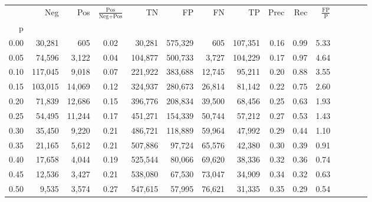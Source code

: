\begin{tabular}{rrrcrrrrrrrrrrr}
\toprule
{} &      Neg &     Pos & $\frac{\text{Pos}}{\text{Neg}+\text{Pos}}$ &       TN &       FP &       FN &       TP &  Prec &   Rec & $\frac{\text{FP}}{\text{P}}$ \\
p    &          &         &                                            &          &          &          &          &       &       &                              \\
\midrule
0.00 &   30,281 &     605 &                                       0.02 &   30,281 &  575,329 &      605 &  107,351 &  0.16 &  0.99 &                         5.33 \\
0.05 &   74,596 &   3,122 &                                       0.04 &  104,877 &  500,733 &    3,727 &  104,229 &  0.17 &  0.97 &                         4.64 \\
0.10 &  117,045 &   9,018 &                                       0.07 &  221,922 &  383,688 &   12,745 &   95,211 &  0.20 &  0.88 &                         3.55 \\
0.15 &  103,015 &  14,069 &                                       0.12 &  324,937 &  280,673 &   26,814 &   81,142 &  0.22 &  0.75 &                         2.60 \\
0.20 &   71,839 &  12,686 &                                       0.15 &  396,776 &  208,834 &   39,500 &   68,456 &  0.25 &  0.63 &                         1.93 \\
0.25 &   54,495 &  11,244 &                                       0.17 &  451,271 &  154,339 &   50,744 &   57,212 &  0.27 &  0.53 &                         1.43 \\
0.30 &   35,450 &   9,220 &                                       0.21 &  486,721 &  118,889 &   59,964 &   47,992 &  0.29 &  0.44 &                         1.10 \\
0.35 &   21,165 &   5,612 &                                       0.21 &  507,886 &   97,724 &   65,576 &   42,380 &  0.30 &  0.39 &                         0.91 \\
0.40 &   17,658 &   4,044 &                                       0.19 &  525,544 &   80,066 &   69,620 &   38,336 &  0.32 &  0.36 &                         0.74 \\
0.45 &   12,536 &   3,427 &                                       0.21 &  538,080 &   67,530 &   73,047 &   34,909 &  0.34 &  0.32 &                         0.63 \\
0.50 &    9,535 &   3,574 &                                       0.27 &  547,615 &   57,995 &   76,621 &   31,335 &  0.35 &  0.29 &                         0.54 \\

\end{tabular}

